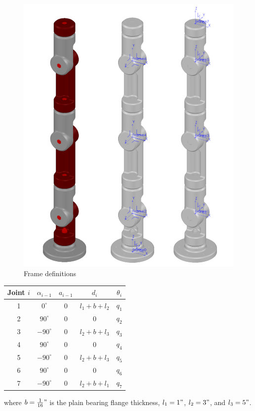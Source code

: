 \documentclass{article}
\begin{document}
\begin{figure}[H]
  \centering
  \includegraphics[height=0.5\linewidth]{dhFrames}
  \caption{Frame definitions}
\end{figure}

\begin{center}
\begin{tabular}{|c c c c c|}
  \hline
  Joint $i$ & $\alpha_{i-1}$ & $a_{i-1}$ & $d_i$ & $\theta_i$ \\
  \hline
  1 & $0^\circ$ & 0 & $l_1 + b + l_2$ & $q_1$ \\
  2 & $90^\circ$ & 0 & 0 & $q_2$ \\
  3 & $-90^\circ$ & 0 & $l_2 + b + l_3$ & $q_3$ \\
  4 & $90^\circ$ & 0 & 0 & $q_4$ \\
  5 & $-90^\circ$ & 0 & $l_2 + b + l_3$ & $q_5$ \\
  6 & $90^\circ$ & 0 & 0 & $q_6$ \\
  7 & $-90^\circ$ & 0 & $l_2 + b + l_1$ & $q_7$ \\
  \hline
\end{tabular}
\end{center}
where $b = \frac{1}{16}"$ is the plain bearing flange thickness, $l_1 = 1"$, $l_2 = 3"$, and $l_3 = 5"$.
\end{document}
